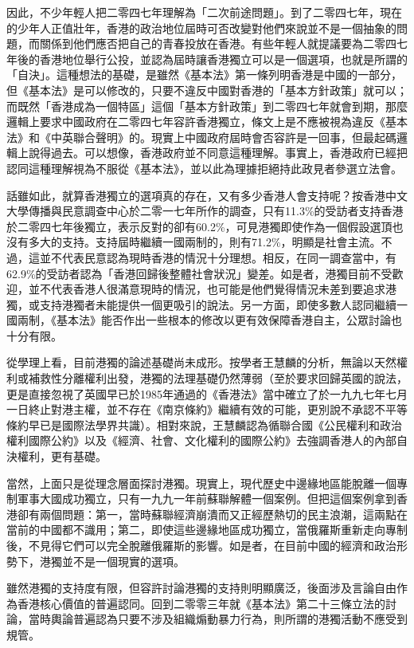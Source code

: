 因此，不少年輕人把二零四七年理解為「二次前途問題」。到了二零四七年，現在的少年人正值壯年，香港的政治地位屆時可否改變對他們來說並不是一個抽象的問題，而關係到他們應否把自己的青春投放在香港。有些年輕人就提議要為二零四七年後的香港地位舉行公投，並認為屆時讓香港獨立可以是一個選項，也就是所謂的「自決」。這種想法的基礎，是雖然《基本法》第一條列明香港是中國的一部分，但《基本法》是可以修改的，只要不違反中國對香港的「基本方針政策」就可以；而既然「香港成為一個特區」這個「基本方針政策」到二零四七年就會到期，那麼邏輯上要求中國政府在二零四七年容許香港獨立，條文上是不應被視為違反《基本法》和《中英聯合聲明》的。現實上中國政府屆時會否容許是一回事，但最起碼邏輯上說得過去。可以想像，香港政府並不同意這種理解。事實上，香港政府已經把認同這種理解視為不服從《基本法》，並以此為理據拒絕持此政見者參選立法會。

話雖如此，就算香港獨立的選項真的存在，又有多少香港人會支持呢？按香港中文大學傳播與民意調查中心於二零一七年所作的調查，只有11.3\%的受訪者支持香港於二零四七年後獨立，表示反對的卻有60.2\%，可見港獨即使作為一個假設選頂也沒有多大的支持。支持屆時繼續一國兩制的，則有71.2\%，明顯是社會主流。不過，這並不代表民意認為現時香港的情況十分理想。相反，在同一調查當中，有62.9\%的受訪者認為「香港回歸後整體社會狀況」變差。如是者，港獨目前不受歡迎，並不代表香港人很滿意現時的情況，也可能是他們覺得情況未差到要追求港獨，或支持港獨者未能提供一個更吸引的說法。另一方面，即使多數人認同繼續一國兩制，《基本法》能否作出一些根本的修改以更有效保障香港自主，公眾討論也十分有限。

從學理上看，目前港獨的論述基礎尚未成形。按學者王慧麟的分析，無論以天然權利或補救性分離權利出發，港獨的法理基礎仍然薄弱（至於要求回歸英國的說法，更是直接忽視了英國早已於1985年通過的《香港法》當中確立了於一九九七年七月一日終止對港主權，並不存在《南京條約》繼續有效的可能，更別說不承認不平等條約早已是國際法學界共識）。相對來說，王慧麟認為循聯合國《公民權利和政治權利國際公約》以及《經濟、社會、文化權利的國際公約》去強調香港人的內部自決權利，更有基礎。

當然，上面只是從理念層面探討港獨。現實上，現代歷史中邊緣地區能脫離一個專制軍事大國成功獨立，只有一九九一年前蘇聯解體一個案例。但把這個案例拿到香港卻有兩個問題：第一，當時蘇聯經濟崩潰而又正經歷熱切的民主浪潮，這兩點在當前的中國都不識用；第二，即使這些邊緣地區成功獨立，當俄羅斯重新走向專制後，不見得它們可以完全脫離俄羅斯的影響。如是者，在目前中國的經濟和政治形勢下，港獨並不是一個現實的選項。

雖然港獨的支持度有限，但容許討論港獨的支持則明顯廣泛，後面涉及言論自由作為香港核心價值的普遍認同。回到二零零三年就《基本法》第二十三條立法的討論，當時輿論普遍認為只要不涉及組織煽動暴力行為，則所謂的港獨活動不應受到規管。

